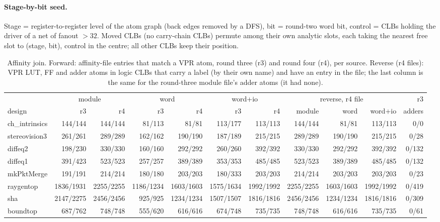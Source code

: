 \paragraph{Stage-by-bit seed.} Stage = register-to-register level of the atom graph (back edges removed by a DFS), bit = round-two word bit,
control = CLBs holding the driver of a net of fanout $>32$. Moved CLBs (no carry-chain CLBs) permute among their own analytic slots, each taking the nearest free slot to
(stage, bit), control in the centre; all other CLBs keep their position.

\begin{table}[t]
\caption{Affinity join. Forward: affinity-file entries that match a VPR atom, round three (r3) and round four (r4), per source. Reverse (r4 files): VPR LUT, FF and adder atoms in logic CLBs that carry a label (by their own name) and have an entry in the file; the last column is the same for the round-three module file's adder atoms (it had none).}
\label{tab:r4join}
\centering\scriptsize\setlength{\tabcolsep}{3pt}
\begin{tabular}{@{}lrrrrrrrrrr@{}}
\toprule
 & \multicolumn{2}{c}{module} & \multicolumn{2}{c}{word} & \multicolumn{2}{c}{word+io} & \multicolumn{3}{c}{reverse, r4 file} & r3 \\
design & r3 & r4 & r3 & r4 & r3 & r4 & module & word & word+io & adders \\
\midrule
ch\_intrinsics & 144/144 & 144/144 & 81/113 & 81/81 & 113/177 & 113/113 & 144/144 & 81/81 & 113/113 & 0/0 \\
stereovision3 & 261/261 & 289/289 & 162/162 & 190/190 & 187/189 & 215/215 & 289/289 & 190/190 & 215/215 & 0/28 \\
diffeq2 & 198/230 & 330/330 & 160/160 & 292/292 & 260/260 & 392/392 & 330/330 & 292/292 & 392/392 & 0/132 \\
diffeq1 & 391/423 & 523/523 & 257/257 & 389/389 & 353/353 & 485/485 & 523/523 & 389/389 & 485/485 & 0/132 \\
mkPktMerge & 191/191 & 214/214 & 180/180 & 203/203 & 180/333 & 203/203 & 214/214 & 203/203 & 203/203 & 0/23 \\
raygentop & 1836/1931 & 2255/2255 & 1186/1234 & 1603/1603 & 1575/1634 & 1992/1992 & 2255/2255 & 1603/1603 & 1992/1992 & 0/419 \\
sha & 2147/2275 & 2456/2456 & 925/925 & 1234/1234 & 1507/1507 & 1816/1816 & 2456/2456 & 1234/1234 & 1816/1816 & 0/309 \\
boundtop & 687/762 & 748/748 & 555/620 & 616/616 & 674/748 & 735/735 & 748/748 & 616/616 & 735/735 & 0/61 \\

\end{tabular}
\end{table}
